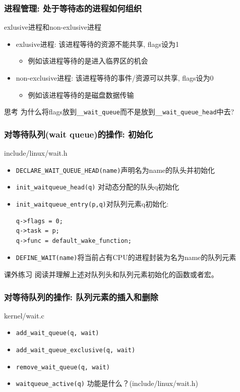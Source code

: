 \documentclass[xcolor=svgnames]{beamer}
\begin{document}
\begin{CJK*}{UTF8}{gbsn}
\begin{frame}[fragile]
\frametitle{进程管理: 处于等待态的进程如何组织}
\begin{block}{exlusive进程和non-exlusive进程}
\begin{itemize}
\item exlusive进程: 该进程等待的资源不能共享, flags设为1
\begin{itemize}
\item 例如该进程等待的是进入临界区的机会
\end{itemize}
\item non-exclusive进程: 该进程等待的事件/资源可以共享, flags设为0
\begin{itemize}
\item 例如该进程等待的是磁盘数据传输
\end{itemize}
\end{itemize}
\end{block}
\begin{block}{思考}
为什么将flags放到\verb|__wait_queue|而不是放到\verb|__wait_queue_head|中去?
\end{block}
\end{frame}

\begin{frame}[fragile]
\frametitle{对等待队列(wait queue)的操作: 初始化}
\begin{block}{include/linux/wait.h}
\begin{itemize}
\item \verb|DECLARE_WAIT_QUEUE_HEAD(name)|声明名为name的队头并初始化
\item \verb|init_waitqueue_head(q)| 对动态分配的队头q初始化
\item \verb|init_waitqueue_entry(p,q)|对队列元素q初始化:
\begin{verbatim}
q->flags = 0;
q->task = p;
q->func = default_wake_function;
\end{verbatim}
\item \verb|DEFINE_WAIT(name)|将当前占有CPU的进程封装为名为name的队列元素
\end{itemize}
\end{block}
\begin{block}{课外练习}
阅读并理解上述对队列头和队列元素初始化的函数或者宏。
\end{block}
\end{frame}

\begin{frame}[fragile]
\frametitle{对等待队列的操作: 队列元素的插入和删除}
\begin{block}{kernel/wait.c}
\begin{itemize}
\item \verb|add_wait_queue(q, wait)|
\item \verb|add_wait_queue_exclusive(q, wait)|
\item \verb|remove_wait_queue(q, wait)|
\item \verb|waitqueue_active(q)| 功能是什么？(include/linux/wait.h)
\end{itemize}
\end{block}
\end{frame}


\end{CJK*}
\end{document}
